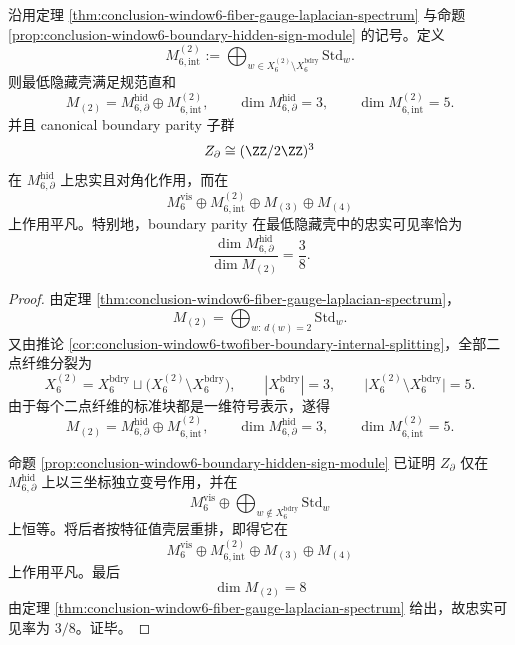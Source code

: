 \begin{corollary}\label{cor:conclusion-window6-lowest-hidden-shell-boundary-interior-three-eighths}
沿用定理 \ref{thm:conclusion-window6-fiber-gauge-laplacian-spectrum} 与命题 \ref{prop:conclusion-window6-boundary-hidden-sign-module} 的记号。定义
\[
M_{6,\mathrm{int}}^{(2)}
:=
\bigoplus_{w\in X_6^{(2)}\setminus X_6^{\mathrm{bdry}}}\mathrm{Std}_w.
\]
则最低隐藏壳满足规范直和
\[
M_{(2)}=M_{6,\partial}^{\mathrm{hid}}\oplus M_{6,\mathrm{int}}^{(2)},
\qquad
\dim M_{6,\partial}^{\mathrm{hid}}=3,
\qquad
\dim M_{6,\mathrm{int}}^{(2)}=5.
\]
并且 canonical boundary parity 子群
\[
Z_{\partial}\cong (\ZZ/2\ZZ)^3
\]
在 \(M_{6,\partial}^{\mathrm{hid}}\) 上忠实且对角化作用，而在
\[
M_6^{\mathrm{vis}}\oplus M_{6,\mathrm{int}}^{(2)}\oplus M_{(3)}\oplus M_{(4)}
\]
上作用平凡。特别地，boundary parity 在最低隐藏壳中的忠实可见率恰为
\[
\frac{\dim M_{6,\partial}^{\mathrm{hid}}}{\dim M_{(2)}}=\frac{3}{8}.
\]
\end{corollary}
\begin{proof}
由定理 \ref{thm:conclusion-window6-fiber-gauge-laplacian-spectrum}，
\[
M_{(2)}=\bigoplus_{w:\,d(w)=2}\mathrm{Std}_w.
\]
又由推论 \ref{cor:conclusion-window6-twofiber-boundary-internal-splitting}，全部二点纤维分裂为
\[
X_6^{(2)}=X_6^{\mathrm{bdry}}\sqcup \bigl(X_6^{(2)}\setminus X_6^{\mathrm{bdry}}\bigr),
\qquad
|X_6^{\mathrm{bdry}}|=3,
\qquad
\bigl|X_6^{(2)}\setminus X_6^{\mathrm{bdry}}\bigr|=5.
\]
由于每个二点纤维的标准块都是一维符号表示，遂得
\[
M_{(2)}=M_{6,\partial}^{\mathrm{hid}}\oplus M_{6,\mathrm{int}}^{(2)},
\qquad
\dim M_{6,\partial}^{\mathrm{hid}}=3,
\qquad
\dim M_{6,\mathrm{int}}^{(2)}=5.
\]

命题 \ref{prop:conclusion-window6-boundary-hidden-sign-module} 已证明 \(Z_{\partial}\) 仅在 \(M_{6,\partial}^{\mathrm{hid}}\) 上以三坐标独立变号作用，并在
\[
M_6^{\mathrm{vis}}\oplus \bigoplus_{w\notin X_6^{\mathrm{bdry}}}\mathrm{Std}_w
\]
上恒等。将后者按特征值壳层重排，即得它在
\[
M_6^{\mathrm{vis}}\oplus M_{6,\mathrm{int}}^{(2)}\oplus M_{(3)}\oplus M_{(4)}
\]
上作用平凡。最后
\[
\dim M_{(2)}=8
\]
由定理 \ref{thm:conclusion-window6-fiber-gauge-laplacian-spectrum} 给出，故忠实可见率为 \(3/8\)。证毕。
\end{proof}

